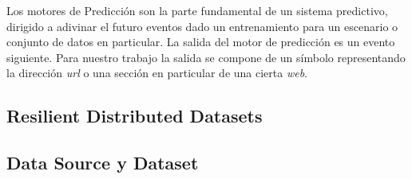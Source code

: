 	Los motores de Predicción son la parte fundamental de un sistema predictivo, dirigido a adivinar el futuro eventos dado un entrenamiento para un escenario o conjunto de datos en particular. La salida del motor de predicción es un evento siguiente. Para nuestro trabajo la salida se compone de un símbolo representando la dirección \emph{url} o una sección en particular de una cierta \emph{web}. 

 


\subsection{Resilient Distributed Datasets}\label{concept-RDD}







\subsection{Data Source y Dataset }
	







 













